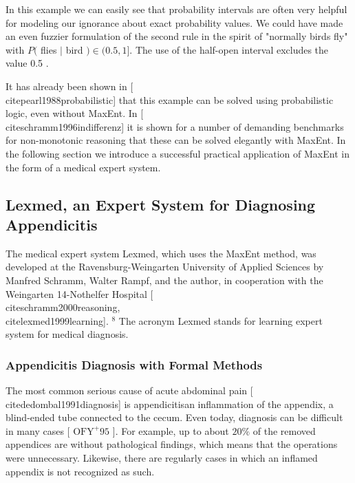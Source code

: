\documentclass[10pt]{book}
\begin{document}
In this example we can easily see that probability intervals are often very helpful for modeling our ignorance about exact probability values. We could have made an even fuzzier formulation of the second rule in the spirit of "normally birds fly" with $P($ flies $\mid$ bird $) \in(0.5,1]$. The use of the half-open interval excludes the value 0.5 .

It has already been shown in [\\cite{pearl1988probabilistic}] that this example can be solved using probabilistic logic, even without MaxEnt. In [\\cite{schramm1996indifferenz}] it is shown for a number of demanding benchmarks for non-monotonic reasoning that these can be solved elegantly with MaxEnt. In the following section we introduce a successful practical application of MaxEnt in the form of a medical expert system.

\subsection*{Lexmed, an Expert System for Diagnosing Appendicitis}
The medical expert system Lexmed, which uses the MaxEnt method, was developed at the Ravensburg-Weingarten University of Applied Sciences by Manfred Schramm, Walter Rampf, and the author, in cooperation with the Weingarten 14-Nothelfer Hospital [\\cite{schramm2000reasoning}, \\cite{lexmed1999learning}]. ${ }^{8}$ The acronym Lexmed stands for learning expert system for medical diagnosis.

\subsubsection*{Appendicitis Diagnosis with Formal Methods}
The most common serious cause of acute abdominal pain [\\cite{dedombal1991diagnosis}] is appendicitisan inflammation of the appendix, a blind-ended tube connected to the cecum. Even today, diagnosis can be difficult in many cases [ $\mathrm{OFY}^{+} 95$ ]. For example, up to about $20 \%$ of the removed appendices are without pathological findings, which means that the operations were unnecessary. Likewise, there are regularly cases in which an inflamed appendix is not recognized as such.
\end{document}
